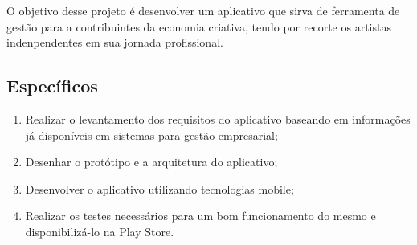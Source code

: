 O objetivo desse projeto é desenvolver um aplicativo que sirva de ferramenta de gestão para a contribuintes da economia criativa, tendo por recorte os artistas indenpendentes em sua jornada profissional.

\subsection{Específicos}\label{subsec:especificos}

\begin{enumerate}
    \item Realizar o levantamento dos requisitos do aplicativo baseando em informações já disponíveis em sistemas para gestão empresarial;
    \item Desenhar o protótipo e a arquitetura do aplicativo;
    \item Desenvolver o aplicativo utilizando tecnologias mobile;
    \item Realizar os testes necessários para um bom funcionamento do mesmo e disponibilizá-lo na Play Store.
\end{enumerate}
